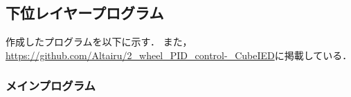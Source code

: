 \begin{center}
    \section*{}                      %
    \vspace*{-2zh}
\end{center}


\subsection{下位レイヤープログラム}

作成したプログラムを以下に示す．
また，\url{https://github.com/Altairu/2_wheel_PID_control-_CubeIED}に掲載している．

\subsubsection{メインプログラム}

